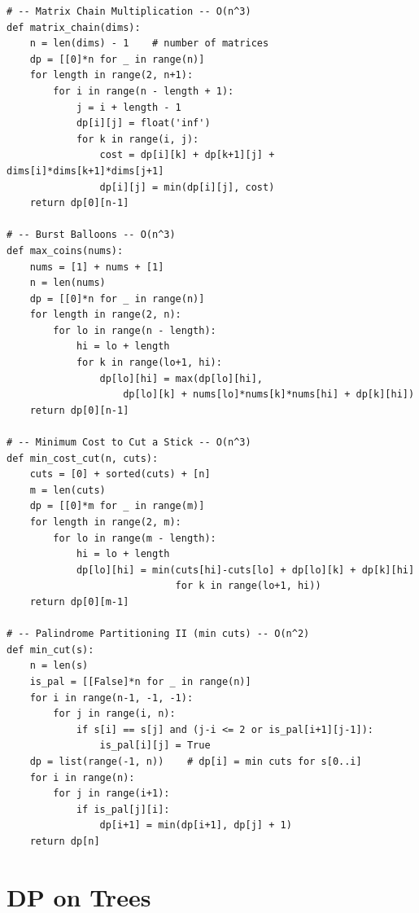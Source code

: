 \documentclass[11pt,a4paper]{report}
\begin{document}
\begin{lstlisting}
# -- Matrix Chain Multiplication -- O(n^3)
def matrix_chain(dims):
    n = len(dims) - 1    # number of matrices
    dp = [[0]*n for _ in range(n)]
    for length in range(2, n+1):
        for i in range(n - length + 1):
            j = i + length - 1
            dp[i][j] = float('inf')
            for k in range(i, j):
                cost = dp[i][k] + dp[k+1][j] + dims[i]*dims[k+1]*dims[j+1]
                dp[i][j] = min(dp[i][j], cost)
    return dp[0][n-1]

# -- Burst Balloons -- O(n^3)
def max_coins(nums):
    nums = [1] + nums + [1]
    n = len(nums)
    dp = [[0]*n for _ in range(n)]
    for length in range(2, n):
        for lo in range(n - length):
            hi = lo + length
            for k in range(lo+1, hi):
                dp[lo][hi] = max(dp[lo][hi],
                    dp[lo][k] + nums[lo]*nums[k]*nums[hi] + dp[k][hi])
    return dp[0][n-1]

# -- Minimum Cost to Cut a Stick -- O(n^3)
def min_cost_cut(n, cuts):
    cuts = [0] + sorted(cuts) + [n]
    m = len(cuts)
    dp = [[0]*m for _ in range(m)]
    for length in range(2, m):
        for lo in range(m - length):
            hi = lo + length
            dp[lo][hi] = min(cuts[hi]-cuts[lo] + dp[lo][k] + dp[k][hi]
                             for k in range(lo+1, hi))
    return dp[0][m-1]

# -- Palindrome Partitioning II (min cuts) -- O(n^2)
def min_cut(s):
    n = len(s)
    is_pal = [[False]*n for _ in range(n)]
    for i in range(n-1, -1, -1):
        for j in range(i, n):
            if s[i] == s[j] and (j-i <= 2 or is_pal[i+1][j-1]):
                is_pal[i][j] = True
    dp = list(range(-1, n))    # dp[i] = min cuts for s[0..i]
    for i in range(n):
        for j in range(i+1):
            if is_pal[j][i]:
                dp[i+1] = min(dp[i+1], dp[j] + 1)
    return dp[n]
\end{lstlisting}

\section{DP on Trees}
\end{document}
